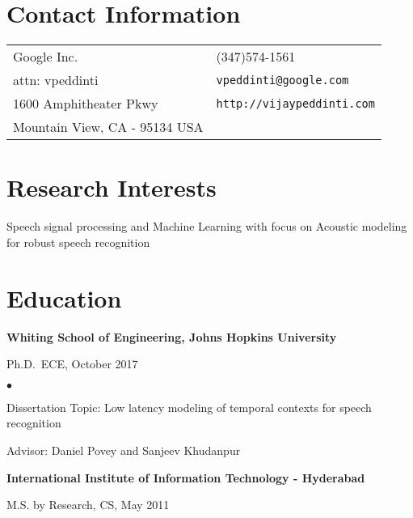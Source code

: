 \documentclass[margin,line,pifont,palatino,courier]{res}
\newenvironment{list1}{
  \begin{list}{\ding{113}}{%
      \setlength{\itemsep}{0in}
      \setlength{\parsep}{0in} \setlength{\parskip}{0in}
      \setlength{\topsep}{0in} \setlength{\partopsep}{0in}
      \setlength{\leftmargin}{0.17in}}}{\end{list}}
\newenvironment{list2}{
  \begin{list}{$\bullet$}{%
      \setlength{\itemsep}{0in}
      \setlength{\parsep}{0in} \setlength{\parskip}{0in}
      \setlength{\topsep}{0in} \setlength{\partopsep}{0in}
      \setlength{\leftmargin}{0.2in}}}{\end{list}}
\begin{document}

\begin{resume}

\section{\sc Contact Information}

\vspace{.05in}
\begin{tabular}{@{}p{2.75in}p{2in}}
Google Inc. & (347)574-1561 \\
attn: vpeddinti                        & \verb+vpeddinti@google.com+\\
1600 Amphitheater Pkwy                  & \verb+http://vijaypeddinti.com+\\
Mountain View, CA - 95134 USA               & \\
\end{tabular}

\section{\sc Research Interests}
Speech signal processing and Machine Learning with focus on Acoustic modeling for robust speech recognition
\section{\sc Education}

{\bf Whiting School of Engineering, Johns Hopkins University}\\
\vspace*{-.1in}
\begin{list1}
\item[] Ph.D.~ECE, October 2017

\begin{list2}
\vspace*{.05in}
\item Dissertation Topic:  Low latency modeling of temporal contexts for speech recognition
\item Advisor: Daniel Povey and Sanjeev Khudanpur
\end{list2}
\end{list1}

{\bf International Institute of Information Technology - Hyderabad}\\
\vspace*{-.1in}
\begin{list1}
\item[] M.S. by Research, CS, May 2011


\end{list1}
\end{resume}
\end{document}
